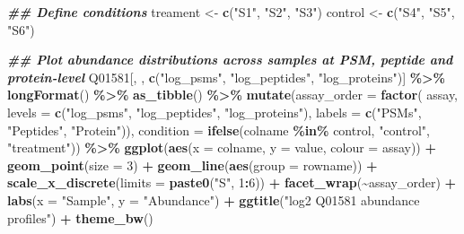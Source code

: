 \documentclass[9pt,a4paper,]{extarticle}
\newenvironment{Shaded}{\begin{snugshade}}{\end{snugshade}}
\newcommand{\AttributeTok}[1]{\textcolor[rgb]{0.13,0.29,0.53}{#1}}
\newcommand{\DecValTok}[1]{\textcolor[rgb]{0.00,0.00,0.81}{#1}}
\newcommand{\DocumentationTok}[1]{\textcolor[rgb]{0.56,0.35,0.01}{\textbf{\textit{#1}}}}
\newcommand{\FunctionTok}[1]{\textcolor[rgb]{0.13,0.29,0.53}{\textbf{#1}}}
\newcommand{\NormalTok}[1]{#1}
\newcommand{\OtherTok}[1]{\textcolor[rgb]{0.56,0.35,0.01}{#1}}
\newcommand{\SpecialCharTok}[1]{\textcolor[rgb]{0.81,0.36,0.00}{\textbf{#1}}}
\newcommand{\StringTok}[1]{\textcolor[rgb]{0.31,0.60,0.02}{#1}}
\begin{document}
\begin{Shaded}
\begin{Highlighting}[]
\DocumentationTok{\#\# Define conditions}
\NormalTok{treament }\OtherTok{\textless{}{-}} \FunctionTok{c}\NormalTok{(}\StringTok{"S1"}\NormalTok{, }\StringTok{"S2"}\NormalTok{, }\StringTok{"S3"}\NormalTok{)}
\NormalTok{control }\OtherTok{\textless{}{-}} \FunctionTok{c}\NormalTok{(}\StringTok{"S4"}\NormalTok{, }\StringTok{"S5"}\NormalTok{, }\StringTok{"S6"}\NormalTok{)}

\DocumentationTok{\#\# Plot abundance distributions across samples at PSM, peptide and protein{-}level}
\NormalTok{Q01581[, , }\FunctionTok{c}\NormalTok{(}\StringTok{"log\_psms"}\NormalTok{, }\StringTok{"log\_peptides"}\NormalTok{, }\StringTok{"log\_proteins"}\NormalTok{)] }\SpecialCharTok{\%\textgreater{}\%}
  \FunctionTok{longFormat}\NormalTok{() }\SpecialCharTok{\%\textgreater{}\%}
  \FunctionTok{as\_tibble}\NormalTok{() }\SpecialCharTok{\%\textgreater{}\%}
  \FunctionTok{mutate}\NormalTok{(}\AttributeTok{assay\_order =} \FunctionTok{factor}\NormalTok{(}
\NormalTok{    assay,}
    \AttributeTok{levels =} \FunctionTok{c}\NormalTok{(}\StringTok{"log\_psms"}\NormalTok{, }\StringTok{"log\_peptides"}\NormalTok{, }\StringTok{"log\_proteins"}\NormalTok{),}
    \AttributeTok{labels =} \FunctionTok{c}\NormalTok{(}\StringTok{"PSMs"}\NormalTok{, }\StringTok{"Peptides"}\NormalTok{, }\StringTok{"Protein"}\NormalTok{)),}
    \AttributeTok{condition =} \FunctionTok{ifelse}\NormalTok{(colname }\SpecialCharTok{\%in\%}\NormalTok{ control, }\StringTok{"control"}\NormalTok{, }\StringTok{"treatment"}\NormalTok{)) }\SpecialCharTok{\%\textgreater{}\%}
  \FunctionTok{ggplot}\NormalTok{(}\FunctionTok{aes}\NormalTok{(}\AttributeTok{x =}\NormalTok{ colname, }\AttributeTok{y =}\NormalTok{ value, }\AttributeTok{colour =}\NormalTok{ assay)) }\SpecialCharTok{+}
  \FunctionTok{geom\_point}\NormalTok{(}\AttributeTok{size =} \DecValTok{3}\NormalTok{) }\SpecialCharTok{+}
  \FunctionTok{geom\_line}\NormalTok{(}\FunctionTok{aes}\NormalTok{(}\AttributeTok{group =}\NormalTok{ rowname)) }\SpecialCharTok{+}
  \FunctionTok{scale\_x\_discrete}\NormalTok{(}\AttributeTok{limits =} \FunctionTok{paste0}\NormalTok{(}\StringTok{"S"}\NormalTok{, }\DecValTok{1}\SpecialCharTok{:}\DecValTok{6}\NormalTok{)) }\SpecialCharTok{+}
  \FunctionTok{facet\_wrap}\NormalTok{(}\SpecialCharTok{\textasciitilde{}}\NormalTok{assay\_order) }\SpecialCharTok{+}
  \FunctionTok{labs}\NormalTok{(}\AttributeTok{x =} \StringTok{"Sample"}\NormalTok{, }\AttributeTok{y =} \StringTok{"Abundance"}\NormalTok{) }\SpecialCharTok{+}
  \FunctionTok{ggtitle}\NormalTok{(}\StringTok{"log2 Q01581 abundance profiles"}\NormalTok{) }\SpecialCharTok{+}
  \FunctionTok{theme\_bw}\NormalTok{()}
\end{Highlighting}
\end{Shaded}
\end{document}
